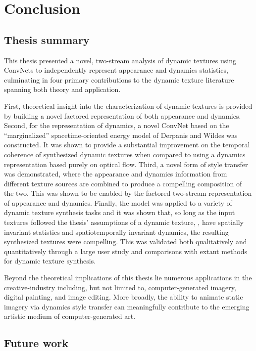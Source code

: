 \chapter{Conclusion}

\section{Thesis summary}\label{sec:thesis_summary}

This thesis presented a novel, two-stream analysis
of dynamic textures using ConvNets to independently represent appearance and
dynamics statistics, culminating in four primary contributions to the dynamic texture literature spanning both theory and application.

First, theoretical insight into the characterization of dynamic textures is provided by building a novel factored representation of both appearance and dynamics. Second, for the representation of dynamics, a novel ConvNet based on the ``marginalized'' spacetime-oriented energy model of Derpanis and Wildes \cite{derpanis2012spacetime} was constructed. It was shown to provide a substantial improvement on the temporal coherence of synthesized dynamic textures when compared to using a dynamics representation based purely on optical flow. Third, a novel form of style transfer was demonstrated, where the appearance and dynamics information from different texture sources are combined to produce a compelling composition of the two. This  was shown to be enabled by the factored two-stream representation of appearance and dynamics. Finally, the model was applied to a variety of dynamic texture synthesis tasks and it was shown that, so long as the input textures followed the thesis' assumptions of a dynamic texture, \ie, have spatially invariant statistics and spatiotemporally invariant dynamics, the resulting synthesized textures were compelling. This  was validated both qualitatively and quantitatively through a large user study and comparisons with extant methods for dynamic texture synthesis.

Beyond the theoretical implications of this thesis lie numerous applications in the creative-industry including, but not limited to, computer-generated imagery, digital painting, and image editing. More broadly, the ability 
to animate static imagery via dynamics style transfer can meaningfully contribute 
to the emerging artistic medium of computer-generated art.

\section{Future work}\label{sec:future_work}

